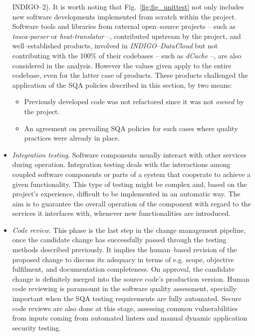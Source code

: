 \documentclass[journal]{IEEEtran}
\begin{document}
\begin{itemize}
INDIGO--2). It is worth noting that Fig.~\ref{fig:fig_unittest} not only includes new software developments
implemented from scratch within the project. Software tools and libraries from
external open--source projects -- such as {\sl tosca-parser} or {\sl heat-translator} --, contributed upstream
by the project, and well--established products, involved in {\sl INDIGO--DataCloud}
but not contributing with the 100\% of their codebases -- such as {\sl dCache} --, are also considered in the
analysis. However the values given apply to the entire codebase, even for the latter case of products. These
products challenged the application of the SQA policies described in this section, by two means:
\begin{itemize}
    \item Previously developed code was not refactored since it was not \textit{owned} by the project.
    \item An agreement on prevailing SQA policies for such cases where quality practices were already in place.
\end{itemize}

\item \textit{Integration testing}. Software components usually interact with other services during
operation. Integration testing deals with the interactions among coupled software components or
parts of a system that cooperate to achieve a given functionality. This type of testing might be
complex and, based on the project's experience, difficult to be implemented in an automatic way. The aim is to
guarantee the overall operation of the component with regard to the services it interfaces with,
whenever new functionalities are introduced.

\item \textit{Code review}.
This phase is the last step in the change management pipeline, once the candidate change has
successfully passed through the testing methods described previously. It implies the human--based
revision of the proposed change to discuss its adequacy in terms of e.g. scope, objective fulfilment,
and documentation completeness. On approval, the candidate change is definitely merged into
the source code's production version. Human code reviewing is paramount in the software quality assessment, specially
important when the SQA testing requirements are fully automated. Secure code reviews are also
done at this stage, assessing common vulnerabilities from inputs coming from automated linters
and manual dynamic application security testing.


\end{itemize}
\end{document}
